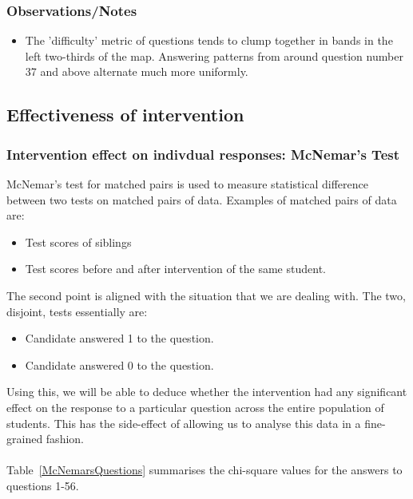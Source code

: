 \documentclass[10pt]{article}
\begin{document}
\subsubsection{Observations/Notes}
\begin{itemize}
\item The 'difficulty' metric of questions tends to clump together in bands in the left two-thirds of the map. Answering patterns from around question number 37 and above alternate much more uniformly.
\end{itemize}

\subsection{Effectiveness of intervention}
\label{sec:InterventionEffectiveness}
\subsubsection{Intervention effect on indivdual responses: McNemar's Test}
McNemar's test for matched pairs is used to measure statistical difference between two tests on matched pairs of data. Examples of matched pairs of data are:
\begin{itemize}
\item Test scores of siblings
\item Test scores before and after intervention of the same student.
\end{itemize}
The second point is aligned with the situation that we are dealing with. The two, disjoint, tests essentially are:
\begin{itemize}
\item Candidate answered 1 to the question.
\item Candidate answered 0 to the question.
\end{itemize}
Using this, we will be able to deduce whether the intervention had any significant effect on the response to a particular question across the entire population of students. This has the side-effect of allowing us to analyse this data in a fine-grained fashion.\\\\
Table~\ref{McNemarsQuestions} summarises the chi-square values for the answers to questions 1-56.
\end{document}
